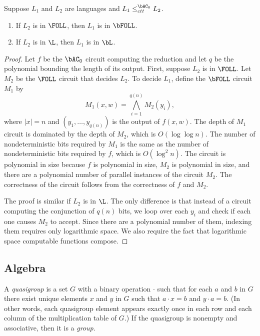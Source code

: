 \documentclass{article}
\begin{document}
\begin{lemma}\label{lem:ctt}
  Suppose $L_1$ and $L_2$ are languages and $L_1 \leq^{\bAC_0}_{ctt} L_2$.
  \begin{enumerate}
  \item If $L_2$ is in $\FOLL$, then $L_1$ is in $\bFOLL$.
  \item If $L_2$ is in $\L$, then $L_1$ is in $\bL$.
  \end{enumerate}
\end{lemma}
\begin{proof}
  Let $f$ be the $\bAC_0$ circuit computing the reduction and let $q$ be the polynomial bounding the length of its output.
  First, suppose $L_2$ is in $\FOLL$.
  Let $M_2$ be the $\FOLL$ circuit that decides $L_2$.
  To decide $L_1$, define the $\bFOLL$ circuit $M_1$ by
  \begin{equation*}
    M_1(x, w) = \bigwedge_{i = 1}^{q(n)} M_2(y_i),
  \end{equation*}
  where $|x| = n$ and $(y_1, \dotsc, y_{q(n)})$ is the output of $f(x, w)$.
  The depth of $M_1$ circuit is dominated by the depth of $M_2$, which is $O(\log \log n)$.
  The number of nondeterministic bits required by $M_1$ is the same as the number of nondeterministic bits required by $f$, which is $O(\log^2 n)$.
  The circuit is polynomial in size because $f$ is polynomial in size, $M_2$ is polynomial in size, and there are a polynomial number of parallel instances of the circuit $M_2$.
  The correctness of the circuit follows from the correctness of $f$ and $M_2$.

  The proof is similar if $L_2$ is in $\L$.
  The only difference is that instead of a circuit computing the conjunction of $q(n)$ bits, we loop over each $y_i$ and check if each one causes $M_2$ to accept.
  Since there are a polynomial number of them, indexing them requires only logarithmic space.
  We also require the fact that logarithmic space computable functions compose.
\end{proof}

\subsection{Algebra}

A \emph{quasigroup} is a set $G$ with a binary operation $\cdot$ such that for each $a$ and $b$ in $G$ there exist unique elements $x$ and $y$ in $G$ such that $a \cdot x = b$ and $y \cdot a = b$.
(In other words, each quasigroup element appears exactly once in each row and each column of the multiplication table of $G$.)
If the quasigroup is nonempty and associative, then it is a \emph{group}.
\end{document}
